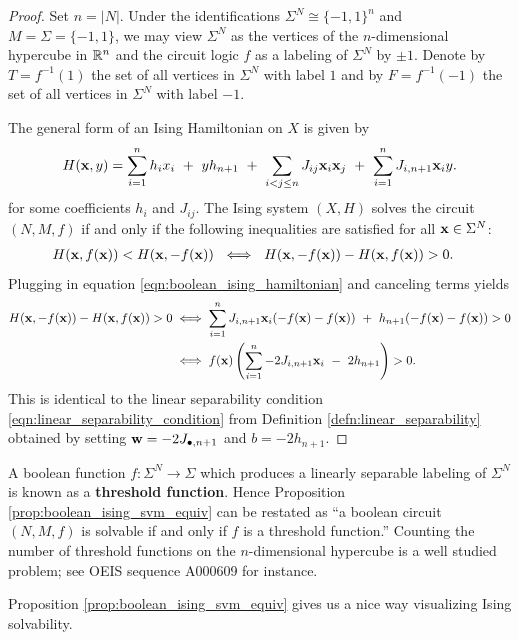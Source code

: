 \documentclass{article}
\begin{document}
\begin{proof}
  Set $n = |N|$. Under the identifications $\Sigma^N \cong \{-1,1\}^n$ and $M = \Sigma = \{-1,1\}$, we may view $\Sigma^N$ as the vertices of the $n$-dimensional hypercube in $\mathbb{R}^n$ and the circuit logic $f$ as a labeling of $\Sigma^N$ by $\pm 1$. Denote by $T = f^{-1}(1)$ the set of all vertices in $\Sigma^N$ with label $1$ and by $F = f^{-1}(-1)$ the set of all vertices in $\Sigma^N$ with label $-1$.

  The general form of an Ising Hamiltonian on $X$ is given by
  \begin{equation}\label{eqn:boolean_ising_hamiltonian}
    H(\mathbf{x}, y) = \sum_{i = 1}^n h_ix_i ~+~ yh_{n+1} ~+~\sum_{i < j \leq n} J_{ij}\mathbf{x}_i\mathbf{x}_j ~+~ \sum_{i=1}^nJ_{i,n+1}\mathbf{x}_iy.
  \end{equation}
  for some coefficients $h_i$ and $J_{ij}$. The Ising system $(X,H)$ solves the circuit $(N,M,f)$ if and only if the following inequalities are satisfied for all $\mathbf{x} \in \Sigma^N$:
  \begin{align*}
    H(\mathbf{x}, f(\mathbf{x})) < H(\mathbf{x}, -f(\mathbf{x})) 
    ~&\iff~ H(\mathbf{x}, -f(\mathbf{x})) - H(\mathbf{x}, f(\mathbf{x})) > 0.
  \end{align*}
  Plugging in equation \ref{eqn:boolean_ising_hamiltonian} and canceling terms yields
  \begin{align*}
    H(\mathbf{x}, -f(\mathbf{x})) - H(\mathbf{x}, f(\mathbf{x})) > 0 
      &\iff \sum_{i=1}^nJ_{i,n+1}\mathbf{x}_i(-f(\mathbf{x}) - f(\mathbf{x})) ~+~ h_{n+1}(-f(\mathbf{x}) - f(\mathbf{x})) > 0 \\
      &\iff f(\mathbf{x})\left(\sum_{i=1}^n -2J_{i,n+1} \mathbf{x}_i ~-~ 2h_{n+1}\right) > 0.
  \end{align*}
  This is identical to the linear separability condition \ref{eqn:linear_separability_condition} from Definition \ref{defn:linear_separability} obtained by setting $\mathbf{w} = -2J_{\bullet, n+1}$ and $b = -2h_{n+1}$. 
\end{proof}
\begin{rmk}\label{rmk:threshold_functions}
  A boolean function $f:\Sigma^N \to \Sigma$ which produces a linearly separable labeling of $\Sigma^N$ is known as a \textbf{threshold function}. Hence Proposition \ref{prop:boolean_ising_svm_equiv} can be restated as ``a boolean circuit $(N,M,f)$ is solvable if and only if $f$ is a threshold function.'' Counting the number of threshold functions on the $n$-dimensional hypercube is a well studied problem; see OEIS sequence A000609 for instance.
\end{rmk}

Proposition \ref{prop:boolean_ising_svm_equiv} gives us a nice way visualizing Ising solvability. 
\end{document}
